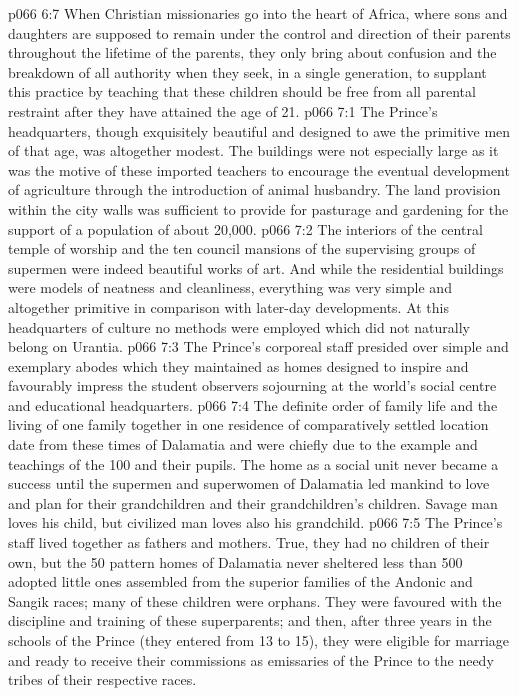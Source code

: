 \vs p066 6:7 When Christian missionaries go into the heart of Africa, where sons and daughters are supposed to remain under the control and direction of their parents throughout the lifetime of the parents, they only bring about confusion and the breakdown of all authority when they seek, in a single generation, to supplant this practice by teaching that these children should be free from all parental restraint after they have attained the age of 21.
\vs p066 7:1 The Prince’s headquarters, though exquisitely beautiful and designed to awe the primitive men of that age, was altogether modest. The buildings were not especially large as it was the motive of these imported teachers to encourage the eventual development of agriculture through the introduction of animal husbandry. The land provision within the city walls was sufficient to provide for pasturage and gardening for the support of a population of about 20,000.
\vs p066 7:2 The interiors of the central temple of worship and the ten council mansions of the supervising groups of supermen were indeed beautiful works of art. And while the residential buildings were models of neatness and cleanliness, everything was very simple and altogether primitive in comparison with later\hyp{}day developments. At this headquarters of culture no methods were employed which did not naturally belong on Urantia.
\vs p066 7:3 The Prince’s corporeal staff presided over simple and exemplary abodes which they maintained as homes designed to inspire and favourably impress the student observers sojourning at the world’s social centre and educational headquarters.
\vs p066 7:4 \pc The definite order of family life and the living of one family together in one residence of comparatively settled location date from these times of Dalamatia and were chiefly due to the example and teachings of the 100 and their pupils. The home as a social unit never became a success until the supermen and superwomen of Dalamatia led mankind to love and plan for their grandchildren and their grandchildren’s children. Savage man loves his child, but civilized man loves also his grandchild.
\vs p066 7:5 The Prince’s staff lived together as fathers and mothers. True, they had no children of their own, but the 50 pattern homes of Dalamatia never sheltered less than 500 adopted little ones assembled from the superior families of the Andonic and Sangik races; many of these children were orphans. They were favoured with the discipline and training of these superparents; and then, after three years in the schools of the Prince (they entered from 13 to 15), they were eligible for marriage and ready to receive their commissions as emissaries of the Prince to the needy tribes of their respective races.
